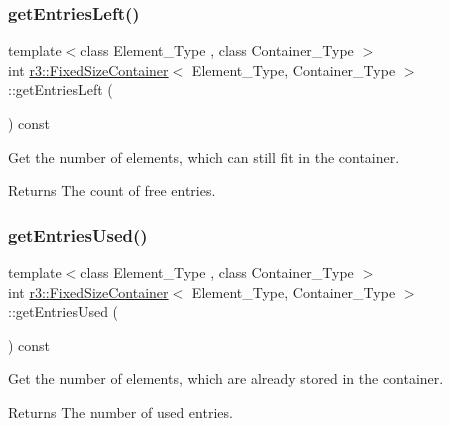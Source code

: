 \subsubsection{\texorpdfstring{get\+Entries\+Left()}{getEntriesLeft()}}
{\footnotesize\ttfamily template$<$class Element\+\_\+\+Type , class Container\+\_\+\+Type $>$ \\
int \mbox{\hyperlink{classr3_1_1_fixed_size_container}{r3\+::\+Fixed\+Size\+Container}}$<$ Element\+\_\+\+Type, Container\+\_\+\+Type $>$\+::get\+Entries\+Left (\begin{DoxyParamCaption}{ }\end{DoxyParamCaption}) const}



Get the number of elements, which can still fit in the container. 

\begin{DoxyReturn}{Returns}
The count of free entries. 
\end{DoxyReturn}
\mbox{\label{classr3_1_1_fixed_size_container_a4ec349530e78e78244f739139ed58b49}} 
\subsubsection{\texorpdfstring{get\+Entries\+Used()}{getEntriesUsed()}}
{\footnotesize\ttfamily template$<$class Element\+\_\+\+Type , class Container\+\_\+\+Type $>$ \\
int \mbox{\hyperlink{classr3_1_1_fixed_size_container}{r3\+::\+Fixed\+Size\+Container}}$<$ Element\+\_\+\+Type, Container\+\_\+\+Type $>$\+::get\+Entries\+Used (\begin{DoxyParamCaption}{ }\end{DoxyParamCaption}) const}



Get the number of elements, which are already stored in the container. 

\begin{DoxyReturn}{Returns}
The number of used entries. 
\end{DoxyReturn}
\mbox{\label{classr3_1_1_fixed_size_container_a984b90ac15df32a41011e665e3059e17}} 
